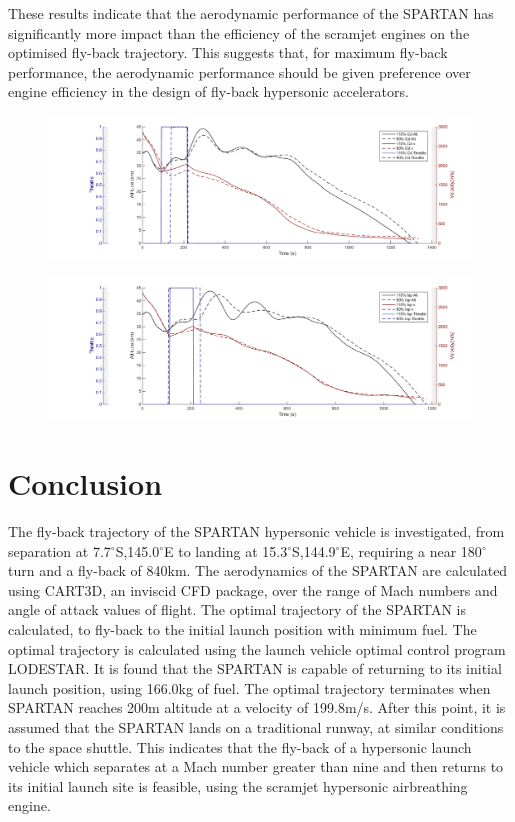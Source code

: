\documentclass[journal]{new-aiaa} %
\begin{document}
These results indicate that the aerodynamic performance of the SPARTAN has significantly more impact than the efficiency of the scramjet engines on the optimised fly-back trajectory. This suggests that, for maximum fly-back performance, the aerodynamic performance should be given preference over engine efficiency in the design of fly-back hypersonic accelerators. 

\begin{figure}[ht]
\centering
\includegraphics[width=0.9\linewidth]{Figures/CdVariation}
\caption{}
\label{fig:CdVariation}
\end{figure}

\begin{figure}[ht]
\centering
\includegraphics[width=0.9\linewidth]{Figures/IspVariation}
\caption{}
\label{fig:IspVariation}
\end{figure}



\section{Conclusion}
The fly-back trajectory of the SPARTAN hypersonic vehicle is investigated, from separation at 7.7$^\circ$S,145.0$^\circ$E to landing at 15.3$^\circ$S,144.9$^\circ$E, requiring a near 180$^\circ$ turn and a fly-back of 840km. The aerodynamics of the SPARTAN are calculated using CART3D, an inviscid CFD package, over the range of Mach numbers and angle of attack values of flight. The optimal trajectory of the SPARTAN is calculated, to fly-back to the initial launch position with minimum fuel. The optimal trajectory is calculated using the launch vehicle optimal control program LODESTAR. It is found that the SPARTAN is capable of returning to its initial launch position, using 166.0kg of fuel. The optimal trajectory terminates when SPARTAN reaches 200m altitude at a velocity of 199.8m/s. After this point, it is assumed that the SPARTAN lands on a traditional runway, at similar conditions to the space shuttle.  
This indicates that the fly-back of a hypersonic launch vehicle which separates at a Mach number greater than nine and then returns to its initial launch site is feasible, using the scramjet hypersonic airbreathing engine. 
\end{document}
